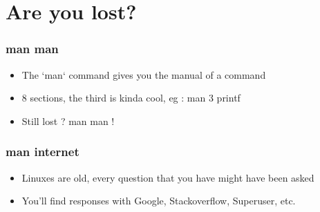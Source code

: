 \section{Are you lost?}


\begin{frame}
    \frametitle{man man}
    \begin{itemize}
	\item The `man` command gives you the manual of a command
	\item 8 sections, the third is kinda cool, eg : man 3 printf
	\item Still lost ? man man !
    \end{itemize}
\end{frame}

\begin{frame}
    \frametitle{man internet}
    \begin{itemize}
	\item Linuxes are old, every question that you have might have been asked
	\item You'll find responses with Google, Stackoverflow, Superuser, etc.
    \end{itemize}
\end{frame}
